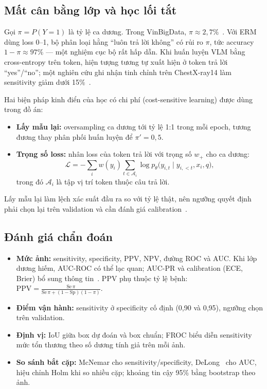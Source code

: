 \subsection{Mất cân bằng lớp và học lối tắt}

Gọi $\pi = P(Y{=}1)$ là tỷ lệ ca dương. Trong VinBigData, $\pi \approx 2{,}7\%$~\cite{nguyen2022vindr}. Với
ERM dùng loss 0--1, bộ phân loại hằng ``luôn trả lời không'' có rủi ro $\pi$, tức accuracy $1-\pi \approx 97\%$
--- một nghiệm cục bộ rất hấp dẫn. Khi huấn luyện VLM bằng cross-entropy trên token, hiện tượng tương tự xuất
hiện ở token trả lời ``yes''/``no''; một nghiên cứu ghi nhận tinh chỉnh trên ChestX-ray14 làm sensitivity giảm
dưới 15\%~\cite{fisher2025vlfm}.

Hai biện pháp kinh điển của học có chi phí (cost-sensitive learning) được dùng trong đồ án:
\begin{itemize}
  \item \textbf{Lấy mẫu lại:} oversampling ca dương tới tỷ lệ 1:1 trong mỗi epoch, tương đương thay phân phối
        huấn luyện để $\pi' = 0{,}5$.
  \item \textbf{Trọng số loss:} nhân loss của token trả lời với trọng số $w_{+}$ cho ca dương:
  \begin{equation}
    \mathcal{L} = -\sum_{i} w(y_i) \sum_{t \in \mathcal{A}_i} \log p_\theta\big(y_{i,t} \mid y_{i,<t}, x_i, q\big),
  \end{equation}
  trong đó $\mathcal{A}_i$ là tập vị trí token thuộc câu trả lời.
\end{itemize}
Lấy mẫu lại làm lệch xác suất đầu ra so với tỷ lệ thật, nên ngưỡng quyết định phải chọn lại trên validation và
cần đánh giá calibration~\cite{mosquera2024imbalance}.

\subsection{Đánh giá chẩn đoán}

\begin{itemize}
  \item \textbf{Mức ảnh:} sensitivity, specificity, PPV, NPV, đường ROC và AUC. Khi lớp dương hiếm, AUC-ROC có
        thể lạc quan; AUC-PR và calibration (ECE, Brier) bổ sung thông tin~\cite{mosquera2024imbalance}. PPV phụ
        thuộc tỷ lệ bệnh: $\text{PPV} = \frac{\text{Se}\,\pi}{\text{Se}\,\pi + (1-\text{Sp})(1-\pi)}$.
  \item \textbf{Điểm vận hành:} sensitivity ở specificity cố định (0,90 và 0,95), ngưỡng chọn trên validation.
  \item \textbf{Định vị:} IoU giữa box dự đoán và box chuẩn; FROC biểu diễn sensitivity mức tổn thương theo số
        dương tính giả trên mỗi ảnh.
  \item \textbf{So sánh bắt cặp:} McNemar cho sensitivity/specificity, DeLong~\cite{delong1988} cho AUC,
        hiệu chỉnh Holm khi so nhiều cặp; khoảng tin cậy 95\% bằng bootstrap theo ảnh.
\end{itemize}

